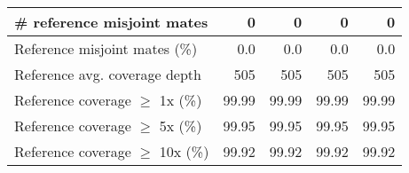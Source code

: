 \documentclass[12pt,a4paper]{article}
\begin{document}
\begin{table}[ht]
\begin{center}
\begin{tabular}{|l*{4}{|r}|}
\# reference misjoint mates & 0 & 0 & 0 & 0 \\ \hline
Reference misjoint mates (\%) & 0.0 & 0.0 & 0.0 & 0.0 \\ \hline
Reference avg. coverage depth & 505 & 505 & 505 & 505 \\ \hline
Reference coverage $\geq$ 1x (\%) & 99.99 & 99.99 & 99.99 & 99.99 \\ \hline
Reference coverage $\geq$ 5x (\%) & 99.95 & 99.95 & 99.95 & 99.95 \\ \hline
Reference coverage $\geq$ 10x (\%) & 99.92 & 99.92 & 99.92 & 99.92 \\ \hline
\end{tabular}
\end{center}
\end{table}
\end{document}
